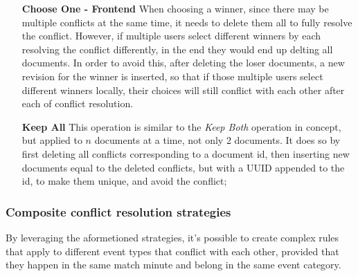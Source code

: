 \begin{itemize}[leftmargin  = 3.25\parindent, align=left]
    \item[\textbf{Choose One - Frontend}] When choosing a winner, since there may be multiple conflicts at the same time, it needs to delete them all to fully resolve the conflict. However, if multiple users select different winners by each resolving the conflict differently, in the end they would end up delting all documents. In order to avoid this, after deleting the loser documents, a new revision for the winner is inserted, so that if those multiple users select different winners locally, their choices will still conflict with each other after each  of conflict resolution. 
    \item[\textbf{Keep All}] This operation is similar to the \textit{Keep Both} operation in concept, but applied to $n$ documents at a time, not only 2 documents. It does so by first deleting all conflicts corresponding to a document id, then inserting new documents equal to the deleted conflicts, but with a UUID appended to the id, to make them unique, and avoid the conflict;
\end{itemize}

\subsubsection{Composite conflict resolution strategies}

By leveraging the aformetioned strategies, it's possible to create complex rules that apply to different event types that conflict with each other, provided that they happen in the same match minute and belong in the same event category.


